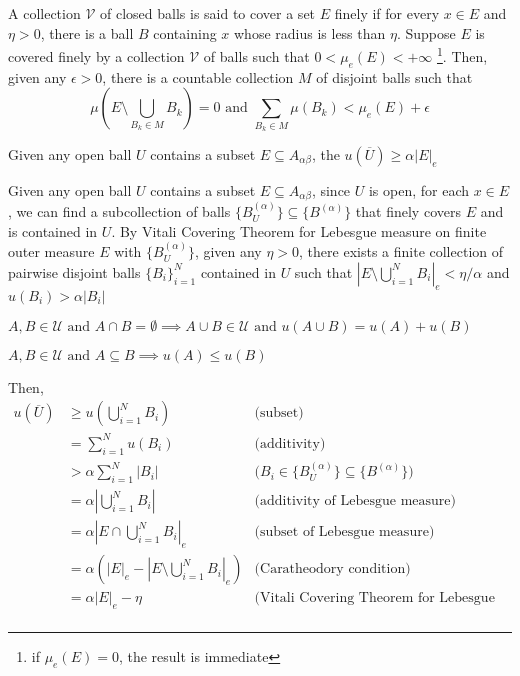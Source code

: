 \documentclass{article}
\begin{document}
\begin{lemma}
    A collection $\mathcal{V}$ of closed balls is said to cover a set $E$ finely if for every $x \in E$ and $\eta > 0$, there is a ball $B$ containing $x$ whose radius is less than $\eta$. Suppose $E$ is covered finely by a collection $\mathcal{V}$ of balls such that $0 < \mu_e(E) < +\infty$ \footnote{if $\mu_e(E) = 0$, the result is immediate}. Then, given any $\epsilon > 0$, there is a countable collection $M$ of disjoint balls such that
    \[
        \mu\left(E \setminus \bigcup_{B_k \in M} B_k \right) = 0 \text{ and } \sum_{B_k \in M} \mu(B_k) < \mu_e(E) + \epsilon
    \]
\end{lemma}

\begin{claim}
\label{claim:1}
Given any open ball $U$ contains a subset $E \subseteq A_{\alpha \beta}$, the $u(\overline{U}) \geq \alpha |E|_e$
\end{claim}

Given any open ball $U$ contains a subset $E \subseteq A_{\alpha \beta}$, since $U$ is open, for each $x \in E$, we can find a subcollection of balls $\{B^{(\alpha)}_U\} \subseteq \{B^{(\alpha)} \}$ that finely covers $E$ and is contained in $U$. By Vitali Covering Theorem for Lebesgue measure on finite outer measure $E$ with $\{B^{(\alpha)}_U \}$, given any $\eta > 0$, there exists a finite collection of pairwise disjoint balls $\{B_i\}_{i=1}^N$ contained in $U$ such that $\left|E \setminus \bigcup_{i=1}^N B_i \right|_e < \eta / \alpha$ and $u(B_i) > \alpha |B_i|$

\begin{assumption}[Additivity]
    $A, B \in \mathcal{U} \text{ and } A \cap B = \emptyset \implies A \cup B \in \mathcal{U} \text{ and } u(A \cup B) = u(A) + u(B)$
\end{assumption}

\begin{assumption}[Subset]
    $A, B \in \mathcal{U} \text{ and } A \subseteq B \implies u(A) \leq u(B)$  
\end{assumption}

Then,
\begin{align*}
    u(\overline{U})
    &\geq u \left(\bigcup_{i=1}^N B_i \right) &\text{(subset)} \\
    &= \sum_{i=1}^N u(B_i) &\text{(additivity)} \\
    &> \alpha \sum_{i=1}^N |B_i| &\text{($B_i \in \{B^{(\alpha)}_U\} \subseteq \{B^{(\alpha)} \}$)}\\
    &= \alpha \left| \bigcup_{i=1}^N B_i \right| &\text{(additivity of Lebesgue measure)} \\
    &= \alpha \left| E \cap \bigcup_{i=1}^N B_i \right|_e &\text{(subset of Lebesgue measure)}\\
    &= \alpha \left( |E|_e - \left| E \setminus \bigcup_{i=1}^N B_i \right|_e \right) &\text{(Caratheodory condition)}\\
    &= \alpha |E|_e - \eta &\text{(Vitali Covering Theorem for Lebesgue measure)}\\
\end{align*}
\end{document}
